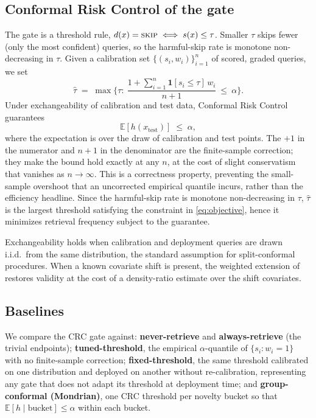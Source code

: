 \documentclass[a4paper,fleqn]{cas-dc}
\begin{document}
\subsection{Conformal Risk Control of the gate}\label{sec:crc}

The gate is a threshold rule, $d(x)=\textsc{skip}\iff s(x)\le\tau$. Smaller
$\tau$ skips fewer (only the most confident) queries, so the harmful-skip rate
is monotone non-decreasing in $\tau$. Given a calibration set
$\{(s_i,w_i)\}_{i=1}^{n}$ of scored, graded queries, we set
\begin{equation}\label{eq:crc}
\hat\tau \;=\; \max\Big\{\tau:\ \frac{1+\sum_{i=1}^{n}\mathbf 1[s_i\le\tau]\,w_i}{n+1}\ \le\ \alpha\Big\}.
\end{equation}
Under exchangeability of calibration and test data, Conformal Risk Control
\citep{angelopoulos2024crc} guarantees
\begin{equation}
\mathbb E[h(x_{\text{test}})] \;\le\; \alpha,
\end{equation}
where the expectation is over the draw of calibration and test points. The
$+1$ in the numerator and $n+1$ in the denominator are the finite-sample
correction; they make the bound hold exactly at any $n$, at the cost of slight
conservatism that vanishes as $n\to\infty$. This is a correctness
property, preventing the small-sample overshoot that an uncorrected empirical
quantile incurs, rather than the efficiency headline. Since the harmful-skip rate
is monotone non-decreasing in $\tau$, $\hat\tau$ is the largest threshold
satisfying the constraint in \eqref{eq:objective}, hence it minimizes retrieval
frequency subject to the guarantee.

Exchangeability holds when calibration and deployment queries are drawn i.i.d.\
from the same distribution, the standard assumption for split-conformal procedures.
When a known covariate shift is present, the weighted extension of
\citet{tibshirani2019covariate} restores validity at the cost of a
density-ratio estimate over the shift covariates.

\subsection{Baselines}\label{sec:baselinesdef}

We compare the CRC gate against: \textbf{never-retrieve} and
\textbf{always-retrieve} (the trivial endpoints); \textbf{tuned-threshold}, the
empirical $\alpha$-quantile of $\{s_i:w_i=1\}$ with no finite-sample correction;
\textbf{fixed-threshold}, the same threshold calibrated on one distribution and
deployed on another without re-calibration, representing any gate that does not
adapt its threshold at deployment time; and
\textbf{group-conformal (Mondrian)}, one CRC threshold per novelty bucket so
that $\mathbb E[h\mid\text{bucket}]\le\alpha$ within each bucket.
\end{document}
